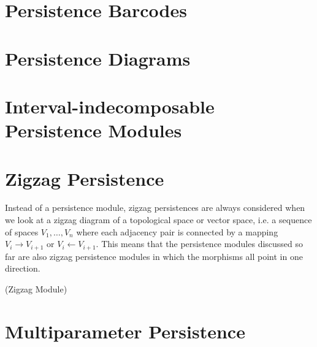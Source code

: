 \section{Persistence Barcodes}

\section{Persistence Diagrams}

\section{Interval-indecomposable Persistence Modules}

\section{Zigzag Persistence}
Instead of a persistence module, zigzag persistences are always considered when we look at a zigzag diagram of a topological space or vector space, i.e. a sequence of spaces $V_1, \ldots, V_n$ where each adjacency pair is connected by a mapping $V_i \rightarrow V_{i+1}$ or $V_i \leftarrow V_{i+1}$. This means that the persistence modules discussed so far are also zigzag persistence modules in which the morphisms all point in one direction.

\begin{definition}{(Zigzag Module) \cite[§2.1]{}}

\end{definition}


\section{Multiparameter Persistence}
